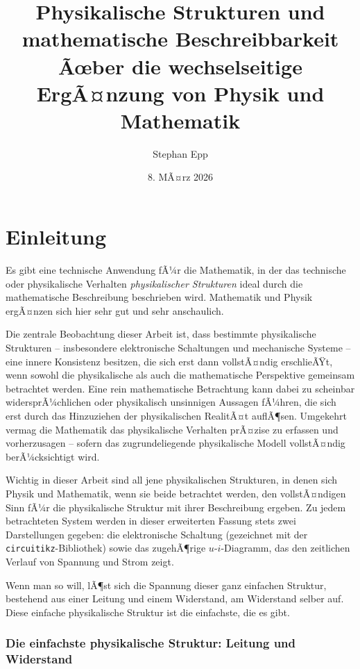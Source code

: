 ﻿\documentclass[12pt, a4paper]{article}
\title{\textbf{Physikalische Strukturen und\\ mathematische Beschreibbarkeit}\\
	\large Ãœber die wechselseitige ErgÃ¤nzung von Physik und Mathematik}
\author{Stephan Epp}
\date{8. MÃ¤rz 2026}
\begin{document}
	
	\maketitle
	\tableofcontents
	\newpage
	
	\section{Einleitung}
	
	Es gibt eine technische Anwendung fÃ¼r die Mathematik, in der das technische oder physikalische Verhalten \textit{physikalischer Strukturen} ideal durch die mathematische Beschreibung beschrieben wird. Mathematik und Physik ergÃ¤nzen sich hier sehr gut und sehr anschaulich.
	
	Die zentrale Beobachtung dieser Arbeit ist, dass bestimmte physikalische Strukturen -- insbesondere elektronische Schaltungen und mechanische Systeme -- eine innere Konsistenz besitzen, die sich erst dann vollstÃ¤ndig erschlieÃŸt, wenn sowohl die physikalische als auch die mathematische Perspektive gemeinsam betrachtet werden. Eine rein mathematische Betrachtung kann dabei zu scheinbar widersprÃ¼chlichen oder physikalisch unsinnigen Aussagen fÃ¼hren, die sich erst durch das Hinzuziehen der physikalischen RealitÃ¤t auflÃ¶sen. Umgekehrt vermag die Mathematik das physikalische Verhalten prÃ¤zise zu erfassen und vorherzusagen -- sofern das zugrundeliegende physikalische Modell vollstÃ¤ndig berÃ¼cksichtigt wird.
	
	Wichtig in dieser Arbeit sind all jene physikalischen Strukturen, in denen sich Physik und Mathematik, wenn sie beide betrachtet werden, den vollstÃ¤ndigen Sinn fÃ¼r die physikalische Struktur mit ihrer Beschreibung ergeben. Zu jedem betrachteten System werden in dieser erweiterten Fassung stets zwei Darstellungen gegeben: die elektronische Schaltung (gezeichnet mit der \texttt{circuitikz}-Bibliothek) sowie das zugehÃ¶rige $u$-$i$-Diagramm, das den zeitlichen Verlauf von Spannung und Strom zeigt.
	
	Wenn man so will, lÃ¶st sich die Spannung dieser ganz einfachen Struktur, bestehend aus einer Leitung und einem Widerstand, am Widerstand selber auf. Diese einfache physikalische Struktur ist die einfachste, die es gibt.

	\subsubsection*{Die einfachste physikalische Struktur: Leitung und Widerstand}
\end{document}
